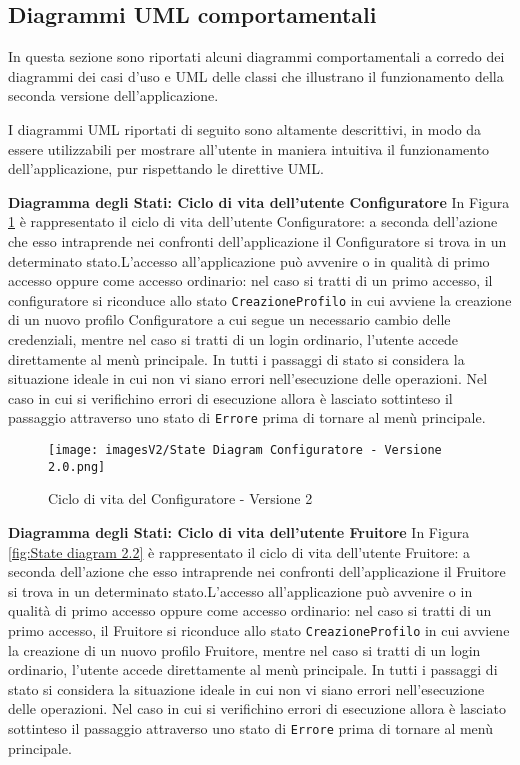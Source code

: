 \newpage
\subsection{Diagrammi UML comportamentali}
In questa sezione sono riportati alcuni diagrammi comportamentali a corredo dei diagrammi dei casi d'uso e UML delle classi che illustrano il funzionamento della seconda versione dell'applicazione.

I diagrammi UML riportati di seguito sono altamente descrittivi, in modo da essere utilizzabili per mostrare all'utente in maniera intuitiva il funzionamento dell'applicazione, pur rispettando le direttive UML.\bigskip

\newpage
\textbf{Diagramma degli Stati: Ciclo di vita dell'utente Configuratore}\newline
In Figura \ref{fig:State diagram 2.1} è rappresentato il ciclo di vita dell'utente Configuratore: a seconda dell'azione che esso intraprende nei confronti dell'applicazione il Configuratore si trova in un determinato stato.\newline L'accesso all'applicazione può avvenire o in qualità di primo accesso oppure come accesso ordinario: nel caso si tratti di un primo accesso, il configuratore si riconduce allo stato \texttt{CreazioneProfilo} in cui avviene la creazione di un nuovo profilo Configuratore a cui segue un necessario cambio delle credenziali, mentre nel caso si tratti di un login ordinario, l'utente accede direttamente al menù principale. \newline 
In tutti i passaggi di stato si considera la situazione ideale in cui non vi siano errori nell'esecuzione delle operazioni. Nel caso in cui si verifichino errori di esecuzione allora è lasciato sottinteso il passaggio attraverso uno stato di \texttt{Errore} prima di tornare al menù principale.

\begin{figure}[h!]
\centering
\texttt{[image: imagesV2/State Diagram Configuratore - Versione 2.0.png]}
\caption{\label{fig:State diagram 2.1}Ciclo di vita del Configuratore - Versione 2}
\end{figure}\bigskip

\textbf{Diagramma degli Stati: Ciclo di vita dell'utente Fruitore}\newline
In Figura \ref{fig:State diagram 2.2} è rappresentato il ciclo di vita dell'utente Fruitore: a seconda dell'azione che esso intraprende nei confronti dell'applicazione il Fruitore si trova in un determinato stato.\newline L'accesso all'applicazione può avvenire o in qualità di primo accesso oppure come accesso ordinario: nel caso si tratti di un primo accesso, il Fruitore si riconduce allo stato \texttt{CreazioneProfilo} in cui avviene la creazione di un nuovo profilo Fruitore, mentre nel caso si tratti di un login ordinario, l'utente accede direttamente al menù principale. \newline 
In tutti i passaggi di stato si considera la situazione ideale in cui non vi siano errori nell'esecuzione delle operazioni. Nel caso in cui si verifichino errori di esecuzione allora è lasciato sottinteso il passaggio attraverso uno stato di \texttt{Errore} prima di tornare al menù principale.

